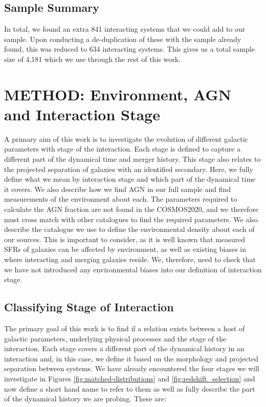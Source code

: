 \subsection{Sample Summary}\label{sec:sample-summary}
In total, we found an extra 841 interacting systems that we could add to our sample. Upon conducting a de-duplication of these with the sample already found, this was reduced to 634 interacting systems. This gives us a total sample size of 4,181 which we use through the rest of this work.


\section{METHOD: Environment, AGN and Interaction Stage} \label{method}
A primary aim of this work is to investigate the evolution of different galactic parameters with stage of the interaction. Each stage is defined to capture a different part of the dynamical time and merger history. This stage also relates to the projected separation of galaxies with an identified secondary. Here, we fully define what we mean by interaction stage and which part of the dynamical time it covers. We also describe how we find AGN in our full sample and find measurements of the environment about each. The parameters required to calculate the AGN fraction are not found in the COSMOS2020, and we therefore must cross match with other catalogues to find the required parameters. We also describe the catalogue we use to define the environmental density about each of our sources. This is important to consider, as it is well known that measured SFRs of galaxies can be affected by environment, as well as existing biases in where interacting and merging galaxies reside. We, therefore, need to check that we have not introduced any environmental biases into our definition of interaction stage. 

\subsection{Classifying Stage of Interaction}\label{sec:staging}
The primary goal of this work is to find if a relation exists between a host of galactic parameters, underlying physical processes and the stage of the interaction. Each stage covers a different part of the dynamical history in an interaction and, in this case, we define it based on the morphology and projected separation between systems. We have already encountered the four stages we will investigate in Figures \ref{fig:matched-distributions} and \ref{fig:redshift_selection} and now define a short hand name to refer to them as well as fully describe the part of the dynamical history we are probing. These are:

